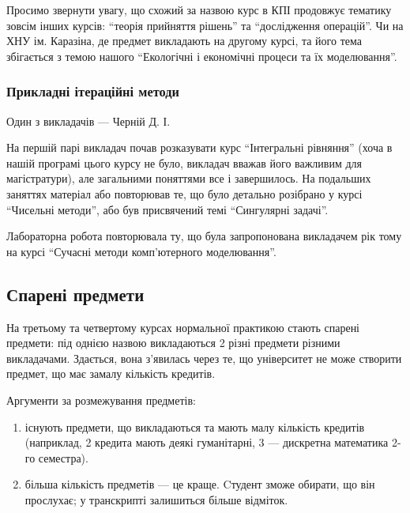 \documentclass[14pt, a4paper]{extarticle}  %
\begin{document}
Просимо звернути увагу, що схожий за назвою курс в КПІ продовжує тематику зовсім інших курсів: ``теорія прийняття рішень'' та ``дослідження операцій''. Чи на ХНУ ім. Каразіна, де предмет викладають на другому курсі, та його тема збігається з темою нашого ``Екологічні і економічні процеси та їх моделювання''. %

\subsubsection{Прикладні ітераційні методи}
Один з викладачів --- Черній Д. І.

На першій парі викладач почав розказувати курс ``Інтегральні рівняння'' (хоча в нашій програмі цього курсу не було, викладач вважав його важливим для магістратури), але загальними поняттями все і завершилось. На подальших заняттях матеріал або повторював те, що було детально розібрано у курсі ``Чисельні методи'', або був присвячений темі ``Сингулярні задачі''.

Лабораторна робота повторювала ту, що була запропонована викладачем рік тому на курсі ``Сучасні методи комп'ютерного моделювання''. 

\subsection{Спарені предмети}
\label{conjunctions}
На третьому та четвертому курсах нормальної практикою стають спарені предмети: під однією назвою викладаються 2 різні предмети різними викладачами. Здається, вона з'явилась через те, що університет не може створити предмет, що має замалу кількість кредитів. 

Аргументи за розмежування предметів:
\begin{enumerate}
    \item існують предмети, що викладаються та мають малу кількість кредитів (наприклад, 2 кредита мають деякі гуманітарні, 3 --- дискретна математика 2-го семестра). 
    \item більша кількість предметів --- це краще. Cтудент зможе обирати, що він прослухає; у транскрипті залишиться більше відміток.
\end{enumerate}
\end{document}
